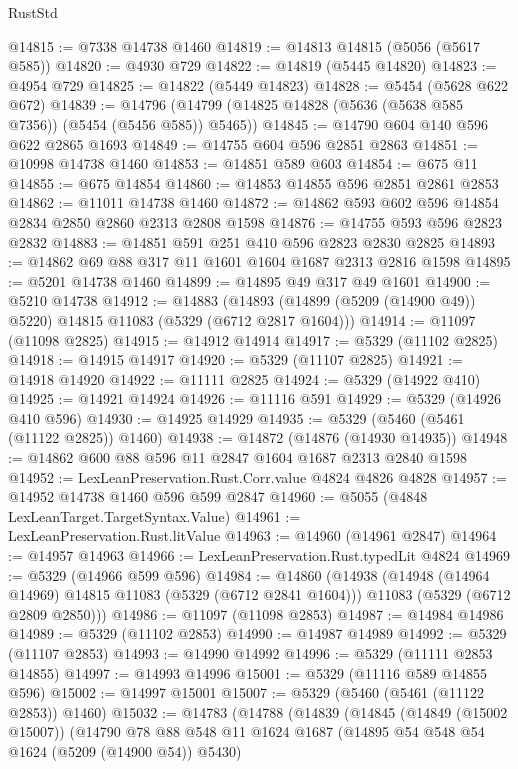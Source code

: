 \begin{lexlean}{RustStd}
\begin{coremodule}
@14815 := @7338 @14738 @1460
@14819 := @14813 @14815 (@5056 (@5617 @585))
@14820 := @4930 @729
@14822 := @14819 (@5445 @14820)
@14823 := @4954 @729
@14825 := @14822 (@5449 @14823)
@14828 := @5454 (@5628 @622 @672)
@14839 := @14796 (@14799 (@14825 @14828 (@5636 (@5638 @585 @7356)) (@5454 (@5456 @585)) @5465))
@14845 := @14790 @604 @140 @596 @622 @2865 @1693
@14849 := @14755 @604 @596 @2851 @2863
@14851 := @10998 @14738 @1460
@14853 := @14851 @589 @603
@14854 := @675 @11
@14855 := @675 @14854
@14860 := @14853 @14855 @596 @2851 @2861 @2853
@14862 := @11011 @14738 @1460
@14872 := @14862 @593 @602 @596 @14854 @2834 @2850 @2860 @2313 @2808 @1598
@14876 := @14755 @593 @596 @2823 @2832
@14883 := @14851 @591 @251 @410 @596 @2823 @2830 @2825
@14893 := @14862 @69 @88 @317 @11 @1601 @1604 @1687 @2313 @2816 @1598
@14895 := @5201 @14738 @1460
@14899 := @14895 @49 @317 @49 @1601
@14900 := @5210 @14738
@14912 := @14883
    (@14893 (@14899 (@5209 (@14900 @49)) @5220) @14815 @11083 (@5329 (@6712 @2817 @1604)))
@14914 := @11097 (@11098 @2825)
@14915 := @14912 @14914
@14917 := @5329 (@11102 @2825)
@14918 := @14915 @14917
@14920 := @5329 (@11107 @2825)
@14921 := @14918 @14920
@14922 := @11111 @2825
@14924 := @5329 (@14922 @410)
@14925 := @14921 @14924
@14926 := @11116 @591
@14929 := @5329 (@14926 @410 @596)
@14930 := @14925 @14929
@14935 := @5329 (@5460 (@5461 (@11122 @2825)) @1460)
@14938 := @14872 (@14876 (@14930 @14935))
@14948 := @14862 @600 @88 @596 @11 @2847 @1604 @1687 @2313 @2840 @1598
@14952 := LexLeanPreservation.Rust.Corr.value @4824 @4826 @4828
@14957 := @14952 @14738 @1460 @596 @599 @2847
@14960 := @5055 (@4848 LexLeanTarget.TargetSyntax.Value)
@14961 := LexLeanPreservation.Rust.litValue
@14963 := @14960 (@14961 @2847)
@14964 := @14957 @14963
@14966 := LexLeanPreservation.Rust.typedLit @4824
@14969 := @5329 (@14966 @599 @596)
@14984 := @14860
    (@14938
      (@14948 (@14964 @14969) @14815 @11083 (@5329 (@6712 @2841 @1604)))
      @11083
      (@5329 (@6712 @2809 @2850)))
@14986 := @11097 (@11098 @2853)
@14987 := @14984 @14986
@14989 := @5329 (@11102 @2853)
@14990 := @14987 @14989
@14992 := @5329 (@11107 @2853)
@14993 := @14990 @14992
@14996 := @5329 (@11111 @2853 @14855)
@14997 := @14993 @14996
@15001 := @5329 (@11116 @589 @14855 @596)
@15002 := @14997 @15001
@15007 := @5329 (@5460 (@5461 (@11122 @2853)) @1460)
@15032 := @14783
    (@14788
      (@14839
        (@14845
          (@14849 (@15002 @15007))
          (@14790
            @78
            @88
            @548
            @11
            @1624
            @1687
            (@14895 @54 @548 @54 @1624 (@5209 (@14900 @54)) @5430)

\end{coremodule}
\end{lexlean}
